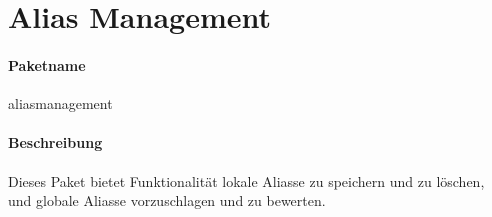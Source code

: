 \newpage
\section{Alias Management}
\paragraph*{Paketname}
aliasmanagement
\paragraph*{Beschreibung}
Dieses Paket bietet Funktionalität lokale Aliasse zu speichern und zu löschen, 
und globale Aliasse vorzuschlagen und zu bewerten.

